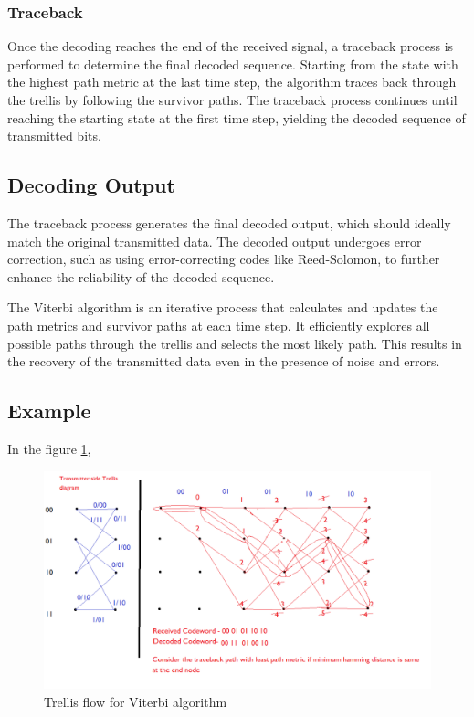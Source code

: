 \subsubsection{Traceback}
Once the decoding reaches the end of the received signal, a traceback process is performed to determine the final decoded sequence.
Starting from the state with the highest path metric at the last time step, the algorithm traces back through the trellis by following the survivor paths.
The traceback process continues until reaching the starting state at the first time step, yielding the decoded sequence of transmitted bits.

\subsection{Decoding Output}
The traceback process generates the final decoded output, which should ideally match the original transmitted data.
The decoded output undergoes error correction, such as using error-correcting codes like Reed-Solomon, to further enhance the reliability of the decoded sequence.

\noindent The Viterbi algorithm is an iterative process that calculates and updates the path metrics and survivor paths at each time step. It efficiently explores all possible paths through the trellis and selects the most likely path. This results in the recovery of the transmitted data even in the presence of noise and errors.

\subsection{Example}
In the figure \ref{fig:Trellis},
\begin{normalsize}
\begin{figure}[ht]
	\centering
	\includegraphics[width=1\columnwidth]{figs/Trellis_navic.png}
	\centering
	\captionsetup{justification=centering}
	\caption{Trellis flow for Viterbi algorithm}
	\label{fig:Trellis}
\end{figure}
\end{normalsize}


